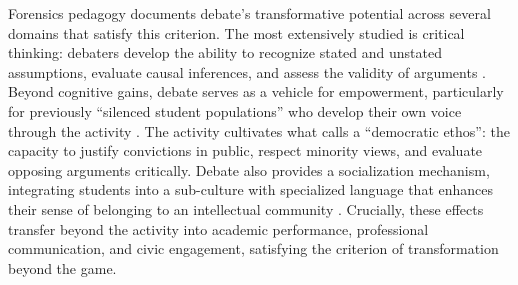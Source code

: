 Forensics pedagogy documents debate's transformative potential across several domains that satisfy this criterion. The most extensively studied is critical thinking: debaters develop the ability to recognize stated and unstated assumptions, evaluate causal inferences, and assess the validity of arguments \parencite{colbert1995enhancing, hill1993value}. Beyond cognitive gains, debate serves as a vehicle for empowerment, particularly for previously ``silenced student populations'' who develop their own voice through the activity \parencite{snider2003gamemaster}. The activity cultivates what \textcite{hicks1998public} calls a ``democratic ethos'': the capacity to justify convictions in public, respect minority views, and evaluate opposing arguments critically. Debate also provides a socialization mechanism, integrating students into a sub-culture with specialized language that enhances their sense of belonging to an intellectual community \parencite{cirlin1997sociological, kargacin1998state}. Crucially, these effects transfer beyond the activity into academic performance, professional communication, and civic engagement, satisfying the criterion of transformation beyond the game.

